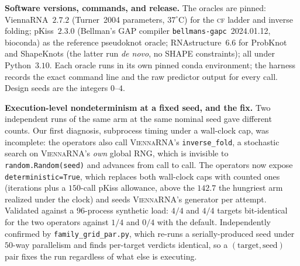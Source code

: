 \documentclass[11pt]{article}
\newcommand{\CF}{\textsc{cf}}
\begin{document}
\smallskip\noindent\textbf{Software versions, commands, and release.} The oracles are pinned:
ViennaRNA~$2.7.2$ (Turner~2004 parameters, $37^\circ$C) for the \CF{} ladder and inverse folding; pKiss~$2.3.0$
(Bellman's GAP compiler \texttt{bellmans-gapc}~2024.01.12, bioconda) as the reference pseudoknot oracle;
RNAstructure~$6.6$ for ProbKnot and ShapeKnots (the latter run \emph{de novo}, no SHAPE constraints); all under
Python~$3.10$. Each oracle runs in its own pinned conda environment; the harness records the exact command line
and the raw predictor output for every call. Design seeds are the integers $0$--$4$.

\smallskip\noindent\textbf{Execution-level nondeterminism at a fixed seed, and the fix.} Two independent runs
of the same arm at the same nominal seed gave different counts. Our first diagnosis, subprocess timing under a
wall-clock cap, was incomplete: the operators also call \textsc{ViennaRNA}'s \texttt{inverse\_fold}, a
stochastic search on \textsc{ViennaRNA}'s \emph{own} global RNG, which is invisible to
\texttt{random.Random(seed)} and advances from call to call. The operators now expose
\texttt{deterministic=True}, which replaces both wall-clock caps with counted ones (iterations plus a $150$-call
pKiss allowance, above the $142.7$ the hungriest arm realized under the clock) and seeds \textsc{ViennaRNA}'s
generator per attempt. Validated against a $96$-process synthetic load: $4/4$ and $4/4$ targets bit-identical
for the two operators against $1/4$ and $0/4$ with the default. Independently confirmed by
\texttt{family\_grid\_par.py}, which re-runs a serially-produced seed under $50$-way parallelism and finds
per-target verdicts identical, so a $(\text{target},\text{seed})$ pair fixes the run regardless of what else is
executing.
\end{document}
